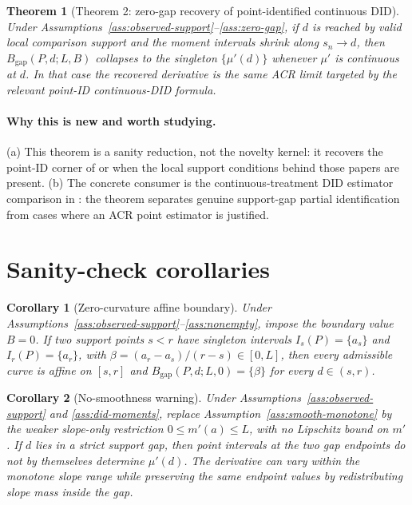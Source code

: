 \documentclass[11pt]{article}
\theoremstyle{definition}
\theoremstyle{plain}
\newtheorem{theorem}{Theorem}
\newtheorem{corollary}{Corollary}
\theoremstyle{remark}
\begin{document}
\begin{theorem}[Theorem 2: zero-gap recovery of point-identified continuous DID]\label{thm:zero-gap-recovery}
Under Assumptions~\ref{ass:observed-support}--\ref{ass:zero-gap}, if \(d\) is reached by valid local comparison support and the moment intervals shrink along \(s_n\to d\), then \(B_{\mathrm{gap}}(P,d;L,B)\) collapses to the singleton \(\{\mu'(d)\}\) whenever \(\mu'\) is continuous at \(d\).  In that case the recovered derivative is the same ACR limit targeted by the relevant point-ID continuous-DID formula.
\end{theorem}
\paragraph{Why this is new and worth studying.}
(a) This theorem is a sanity reduction, not the novelty kernel: it recovers the point-ID corner of \citet{DHaultfoeuilleHoderleinSasaki2023} or \citet{deChaisemartinDHaultfoeuillePasquierSowVazquezBare2022} when the local support conditions behind those papers are present.  (b) The concrete consumer is the continuous-treatment DID estimator comparison in \citet{CallawayGoodmanBaconSantAnna2024}: the theorem separates genuine support-gap partial identification from cases where an ACR point estimator is justified.

\section{Sanity-check corollaries}
\begin{corollary}[Zero-curvature affine boundary]\label{cor:linear}
Under Assumptions~\ref{ass:observed-support}--\ref{ass:nonempty}, impose the boundary value \(B=0\).  If two support points \(s<r\) have singleton intervals \(I_s(P)=\{a_s\}\) and \(I_r(P)=\{a_r\}\), with \(\beta=(a_r-a_s)/(r-s)\in[0,L]\), then every admissible curve is affine on \([s,r]\) and \(B_{\mathrm{gap}}(P,d;L,0)=\{\beta\}\) for every \(d\in(s,r)\).
\end{corollary}

\begin{corollary}[No-smoothness warning]\label{cor:no-smoothness}
Under Assumptions~\ref{ass:observed-support} and \ref{ass:did-moments}, replace Assumption~\ref{ass:smooth-monotone} by the weaker slope-only restriction \(0\le m'(a)\le L\), with no Lipschitz bound on \(m'\).  If \(d\) lies in a strict support gap, then point intervals at the two gap endpoints do not by themselves determine \(\mu'(d)\).  The derivative can vary within the monotone slope range while preserving the same endpoint values by redistributing slope mass inside the gap.
\end{corollary}
\end{document}
